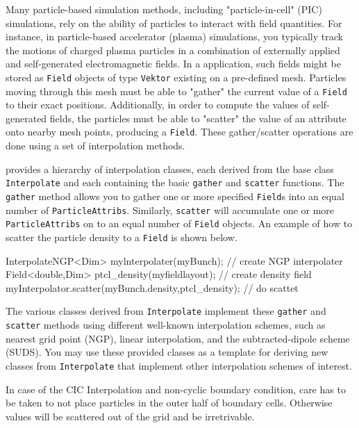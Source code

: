
Many particle-based simulation methods, including "particle-in-cell" (PIC) simulations, rely on the ability of particles to interact with field quantities. For instance, in particle-based accelerator (plasma) simulations, you typically track the motions of charged plasma particles in a combination of externally applied and self-generated electromagnetic fields. In a \ippl application, such fields might be stored as \texttt{Field} objects of type \texttt{Vektor} existing on a pre-defined mesh. Particles moving through this mesh must be able to "gather" the current value of a \texttt{Field} to their exact positions. Additionally, in order to compute the values of self-generated fields, the particles must be able to "scatter" the value of an attribute onto nearby mesh points, producing a \texttt{Field}. These gather/scatter operations are done using a set of \ippl interpolation methods.

\ippl provides a hierarchy of interpolation classes, each derived from the base class \texttt{Interpolate} and each containing the basic \texttt{gather} and \texttt{scatter} functions. The \texttt{gather} method allows you to gather one or more specified \texttt{Field}s into an equal number of \texttt{ParticleAttribs}. Similarly, \texttt{scatter} will accumulate one or more \texttt{ParticleAttribs} on to an equal number of \texttt{Field} objects. An example of how to scatter the particle density to a \texttt{Field} is shown below.
\begin{smallcode}
InterpolateNGP<Dim> mylnterpolater(myBunch);           // create NGP interpolater
Field<double,Dim> ptcl_density(myfieldlayout);         // create density field
myInterpolator.scatter(myBunch.density,ptcl_density);  // do scattet
\end{smallcode}
The various classes derived from \texttt{Interpolate} implement these \texttt{gather} and \texttt{scatter} methods using different well-known interpolation schemes, such as nearest grid point (NGP), linear interpolation, and the subtracted-dipole scheme (SUDS). You may use these provided classes as a template for deriving new classes from \texttt{Interpolate} that implement other interpolation schemes of interest.

In case of the CIC Interpolation and non-cyclic boundary condition, care has to be taken to not place particles in the outer half of boundary cells. Otherwise values will be scattered out of the grid and be irretrivable.
